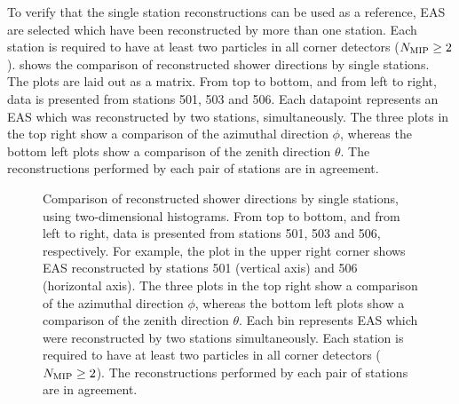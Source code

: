 To verify that the single station reconstructions can be used as a reference,
EAS are selected which have been reconstructed by more than one station. Each
station is required to have at least two particles in all corner detectors
($N_\mathrm{\mip} \geq 2$).
 shows the comparison of reconstructed
shower directions by single stations. The plots are laid out as a matrix. From
top to bottom, and from left to right, data is presented from stations 501, 503
and 506. Each datapoint represents an EAS which was reconstructed
by two stations, simultaneously. The three plots in the top right show a
comparison of the azimuthal direction $\phi$, whereas the bottom left plots show
a comparison of the zenith direction $\theta$. The reconstructions performed by
each pair of stations are in agreement.
\begin{figure}
\centering
{
\longprocess{}
}
\caption{Comparison of reconstructed shower directions by single stations,
using two-dimensional histograms. From top to bottom, and from left to
right, data is presented from stations 501, 503 and 506, respectively.
For example, the plot in the upper right corner shows EAS reconstructed by
stations 501 (vertical axis) and 506 (horizontal axis).  The three plots
in the top right show a comparison of the azimuthal direction $\phi$,
whereas the bottom left plots show a comparison of the zenith direction
$\theta$.  Each bin represents EAS which were reconstructed by two
stations simultaneously.  Each station is required to have at least two
particles in all corner detectors ($N_\mathrm{\mip} \geq 2$).  The
reconstructions performed by each pair of stations are in agreement.}
\label{fig:sciencepark-single-vs-single}
\end{figure}

